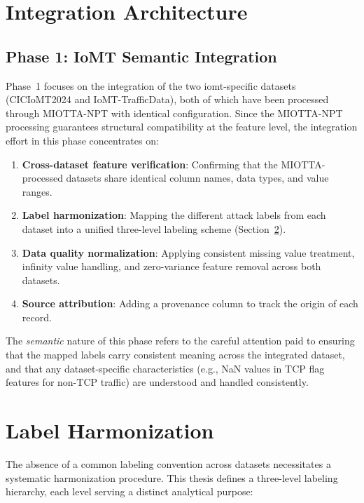 \section{Integration Architecture}
\label{sec:two-phase}

\subsection{Phase 1: IoMT Semantic Integration}
\label{subsec:phase1}

Phase~1 focuses on the integration of the two \gls{iomt}-specific datasets (CICIoMT2024 and IoMT-TrafficData), both of which have been processed through MIOTTA-NPT with identical configuration. Since the MIOTTA-NPT processing guarantees structural compatibility at the feature level, the integration effort in this phase concentrates on:

\begin{enumerate}
    \item \textbf{Cross-dataset feature verification}: Confirming that the MIOTTA-processed datasets share identical column names, data types, and value ranges.
    \item \textbf{Label harmonization}: Mapping the different attack labels from each dataset into a unified three-level labeling scheme (Section~\ref{sec:label-harmonization}).
    \item \textbf{Data quality normalization}: Applying consistent missing value treatment, infinity value handling, and zero-variance feature removal across both datasets.
    \item \textbf{Source attribution}: Adding a provenance column to track the origin of each record.
\end{enumerate}

The \textit{semantic} nature of this phase refers to the careful attention paid to ensuring that the mapped labels carry consistent meaning across the integrated dataset, and that any dataset-specific characteristics (e.g., NaN values in TCP flag features for non-TCP traffic) are understood and handled consistently.

\section{Label Harmonization}
\label{sec:label-harmonization}

The absence of a common labeling convention across datasets necessitates a systematic harmonization procedure. This thesis defines a three-level labeling hierarchy, each level serving a distinct analytical purpose:

